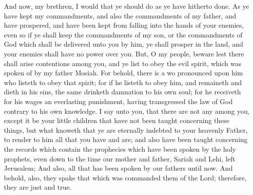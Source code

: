 And now, my brethren, I would that ye should do as ye have hitherto done. As ye have kept my commandments, and also the commandments of my father, and have prospered, and have been kept from falling into the hands of your enemies, even so if ye shall keep the commandments of my son, or the commandments of God which shall be delivered unto you by him, ye shall prosper in the land, and your enemies shall have no power over you.
\bverse \iffalse But, O my people, beware lest there shall arise contentions among you, and ye list to obey the evil spirit, which was spoken of by my father Mosiah. \fi
But, O my people, beware lest there shall arise contentions among you, and ye list to obey the evil spirit, which was spoken of by my father Mosiah.
\bverse \iffalse For behold, there is a wo pronounced upon him who listeth to obey that spirit; for if he listeth to obey him, and remaineth and dieth in his sins, the same drinketh damnation to his own soul; for he receiveth for his wages an everlasting punishment, having transgressed the law of God contrary to his own knowledge. \fi
For behold, there is a wo pronounced upon him who listeth to obey that spirit; for if he listeth to obey him, and remaineth and dieth in his sins, the same drinketh damnation to his own soul; for he receiveth for his wages an everlasting punishment, having transgressed the law of God contrary to his own knowledge.
\bverse \iffalse I say unto you, that there are not any among you, except it be your little children that have not been taught concerning these things, but what knoweth that ye are eternally indebted to your heavenly Father, to render to him all that you have and are; and also have been taught concerning the records which contain the prophecies which have been spoken by the holy prophets, even down to the time our father, Lehi, left Jerusalem; \fi
I say unto you, that there are not any among you, except it be your little children that have not been taught concerning these things, but what knoweth that ye are eternally indebted to your heavenly Father, to render to him all that you have and are; and also have been taught concerning the records which contain the prophecies which have been spoken by the holy prophets, even down to the time our mother and father, Sariah and Lehi, left Jerusalem;
\bverse \iffalse And also, all that has been spoken by our fathers until now.  And behold, also, they spake that which was commanded them of the Lord; therefore, they are just and true. \fi
And also, all that has been spoken by our fathers until now.  And behold, also, they spake that which was commanded them of the Lord; therefore, they are just and true.
